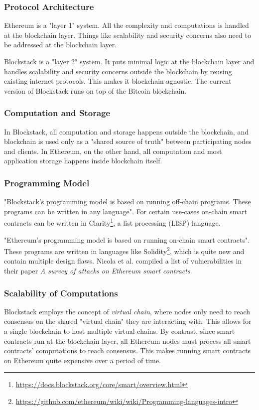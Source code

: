 			\subsubsection{Protocol Architecture}
			Ethereum is a "layer 1" system. All the complexity and computations is handled at the blockchain layer. Things like scalability and security concerns also need to be addressed at the blockchain layer. 
			
			Blockstack is a "layer 2" system. It puts minimal logic at the blockchain layer and handles scalability and security concerns outside the blockchain by reusing existing internet protocols. This makes it blockchain agnostic. The current version of Blockstack runs on top of the Bitcoin blockchain.
		
			\subsubsection{Computation and Storage}
			In Blockstack, all computation and storage happens outside the blockchain, and blockchain is used only as a "shared source of truth" between participating nodes and clients. In Ethereum, on the other hand, all computation and most application storage happens inside blockchain itself.
			
			\subsubsection{Programming Model}
			"Blockstack's programming model is based on running off-chain programs. These programs can be written in any language". For certain use-cases on-chain smart contracts can be written in Clarity\footnote{\url{https://docs.blockstack.org/core/smart/overview.html}}, a list processing (LISP) language.
			
			"Ethereum's programming model is based on running on-chain smart contracts". These programs are written in languages like Solidity\footnote{\url{https://github.com/ethereum/wiki/wiki/Programming-languages-intro}}, which is quite new and contain multiple design flaws. Nicola et al. compiled a list of vulnerabilities in their paper \textit{A survey of attacks on Ethereum smart contracts}\cite{atzei2016survey}.
			
			\subsubsection{Scalability of Computations}
			Blockstack employs the concept of \textit{virtual chain}\cite{nelson2016extending}, where nodes only need to reach consensus on the shared "virtual chain" they are interacting with. This allows for a single blockchain to host multiple virtual chains. By contrast, since smart contracts run at the blockchain layer, all Ethereum nodes must process all smart contracts' computations to reach consensus. This makes running smart contracts on Ethereum quite expensive over a period of time.
		
